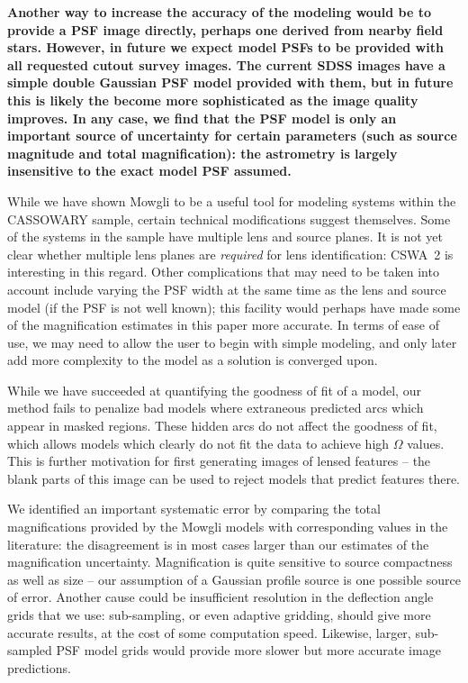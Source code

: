 \documentclass[iop]{emulateapj}
\def\eg{{\it e.g.}\,}
\def\theapplet{{\sc Mowgli}\xspace}
\def\NEW#1{{\bf{#1}}}
\begin{document}
\NEW{Another way to increase the accuracy of the modeling would be to provide
a PSF image directly, perhaps one derived from nearby field stars. However,
in future we expect model PSFs to be provided with all requested cutout
survey images. The current SDSS images have a simple double Gaussian PSF model
provided with them, but in future this is likely the become more sophisticated
as the image quality improves. In any case, we find that the PSF model is only
an important source of uncertainty for certain parameters (such as source
magnitude and total magnification): the astrometry is largely insensitive to
the exact model PSF assumed.}

While we have shown \theapplet to be a useful tool for modeling systems within
the CASSOWARY sample, certain technical modifications suggest themselves. Some
of the systems in the sample have multiple lens and source planes. It is not yet
clear whether multiple lens planes are {\it required} for lens identification:
CSWA~2 is interesting in this regard. Other complications that may need to be
taken into account include varying the PSF width at the same time as the lens
and source model (if the PSF is not well known); this facility would perhaps 
have made some of the magnification estimates in this paper more accurate. In
terms of ease of use, we may need to allow the user to begin with simple
modeling, and only later add more complexity to the model as a solution is 
converged upon.

While we have succeeded at quantifying the goodness of fit of a model, our
method fails to penalize bad models where extraneous predicted arcs which appear
in masked regions. These hidden arcs do not affect the goodness of fit, which
allows models which clearly do not fit the data to achieve high $\Omega$ values.
This is further motivation for first generating images of lensed features -- the
blank parts of this image can be used to reject models that predict features
there. 

We identified an important systematic error by comparing the total 
magnifications provided by the \theapplet models with corresponding values in
the literature: the disagreement is in most cases larger than our estimates of
the magnification uncertainty. Magnification is quite sensitive to source
compactness as well as size \citep[see \eg][]{O+M09} --  our assumption of a
Gaussian profile source is one possible source of error. Another cause could
be insufficient resolution in the deflection angle grids that we use:
sub-sampling, or even adaptive gridding, should give more accurate results, at
the cost of some computation speed. Likewise, larger, sub-sampled
PSF model grids would provide more slower but more accurate image predictions.
\end{document}
